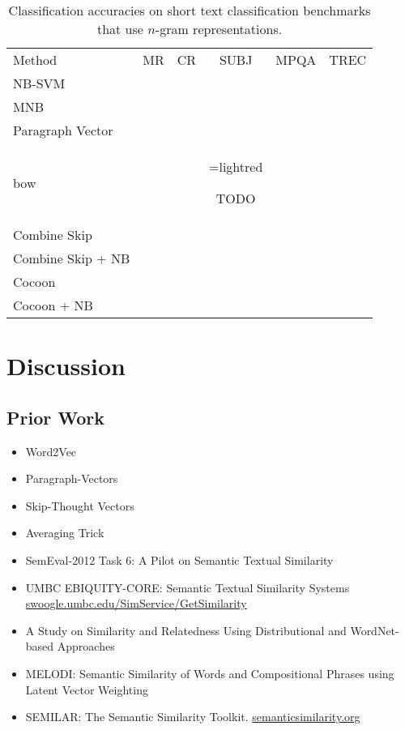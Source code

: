 \documentclass{article}
\makeatletter
\newcommand{\mybox}[2][lightred]{%
  \setbox0=\hbox{#1}%
  \setlength{\@tempdima}{\dimexpr\wd0+13pt}%
  \begin{tcolorbox}[%
    hbox,%
    halign=justify,
    nobeforeafter,%
    colframe=black,%
    colback=#1,%
    boxrule=.5pt,%
    arc=5pt,%
    left=4pt,right=0pt,top=0pt,bottom=0pt,%
    boxsep=2pt]%
    #2
  \end{tcolorbox}
}
\newcommand{\wv}{Word2Vec\xspace}
\makeatother
\begin{document}
\begin{table}[htbp]
  \centering
  \begin{tabular}{l c c c c c}
    Method            & MR & CR & SUBJ & MPQA & TREC \\
    NB-SVM            &    &    &      &      &      \\
    MNB               &    &    &      &      &      \\
    Paragraph Vector  &    &    &      &      &      \\
    bow               &    &    &  \mybox{TODO}    &      &      \\
    Combine Skip      &    &    &      &      &      \\
    Combine Skip + NB &    &    &      &      &      \\\hline
    Cocoon            &    &    &      &      &      \\
    Cocoon + NB       &    &    &      &      &      \\
  \end{tabular}
  \caption{Classification accuracies on short text classification benchmarks
    that use $n$-gram representations.}
  \label{tab:classification}
\end{table}


\section{Discussion}
\label{sec:discussion}
\subsection{Prior Work}
\label{sec:prior-work}
\begin{itemize}
\item \wv
\item Paragraph-Vectors
\item Skip-Thought Vectors
\item Averaging Trick
\item SemEval-2012 Task 6: A Pilot on Semantic Textual Similarity
\item UMBC EBIQUITY-CORE: Semantic Textual Similarity Systems
  \url{swoogle.umbc.edu/SimService/GetSimilarity}
\item A Study on Similarity and Relatedness Using Distributional and
  WordNet-based Approaches
\item MELODI: Semantic Similarity of Words and Compositional Phrases
  using Latent Vector Weighting
\item SEMILAR: The Semantic Similarity Toolkit. \url{semanticsimilarity.org}
\end{itemize}



\end{document}
